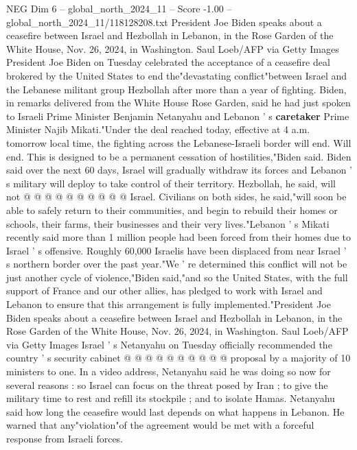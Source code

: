 \begin{textsample}{NEG Dim 6 – global\_north\_2024\_11 – Score -1.00 – global\_north\_2024\_11/118128208.txt}  \label{ex:f6_neg_099}
President Joe Biden speaks about a ceasefire between Israel and Hezbollah in Lebanon, in the Rose Garden of the White House, Nov. 26, 2024, in Washington.
Saul Loeb/AFP via Getty Images President Joe Biden on Tuesday celebrated the acceptance of a ceasefire deal brokered by the United States to end the"devastating conflict"between Israel and the Lebanese militant group Hezbollah after more than a year of fighting.
Biden, in remarks delivered from the White House Rose Garden, said he had just spoken to Israeli Prime Minister Benjamin Netanyahu and Lebanon ' s \textbf{caretaker} Prime Minister Najib Mikati."Under the deal reached today, effective at 4 a.m. tomorrow local time, the fighting across the Lebanese-Israeli border will end.
Will end.
This is designed to be a permanent cessation of hostilities,"Biden said.
Biden said over the next 60 days, Israel will gradually withdraw its forces and Lebanon ' s military will deploy to take control of their territory.
Hezbollah, he said, will not @ @ @ @ @ @ @ @ @ @ Israel.
Civilians on both sides, he said,"will soon be able to safely return to their communities, and begin to rebuild their homes or schools, their farms, their businesses and their very lives."Lebanon ' s Mikati recently said more than 1 million people had been forced from their homes due to Israel ' s offensive.
Roughly 60,000 Israelis have been displaced from near Israel ' s northern border over the past year."We ' re determined this conflict will not be just another cycle of violence,"Biden said,"and so the United States, with the full support of France and our other allies, has pledged to work with Israel and Lebanon to ensure that this arrangement is fully implemented."President Joe Biden speaks about a ceasefire between Israel and Hezbollah in Lebanon, in the Rose Garden of the White House, Nov. 26, 2024, in Washington.
Saul Loeb/AFP via Getty Images Israel ' s Netanyahu on Tuesday officially recommended the country ' s security cabinet @ @ @ @ @ @ @ @ @ @ proposal by a majority of 10 ministers to one.
In a video address, Netanyahu said he was doing so now for several reasons : so Israel can focus on the threat posed by Iran ; to give the military time to rest and refill its stockpile ; and to isolate Hamas.
Netanyahu said how long the ceasefire would last depends on what happens in Lebanon.
He warned that any"violation"of the agreement would be met with a forceful response from Israeli forces.

\end{textsample}

